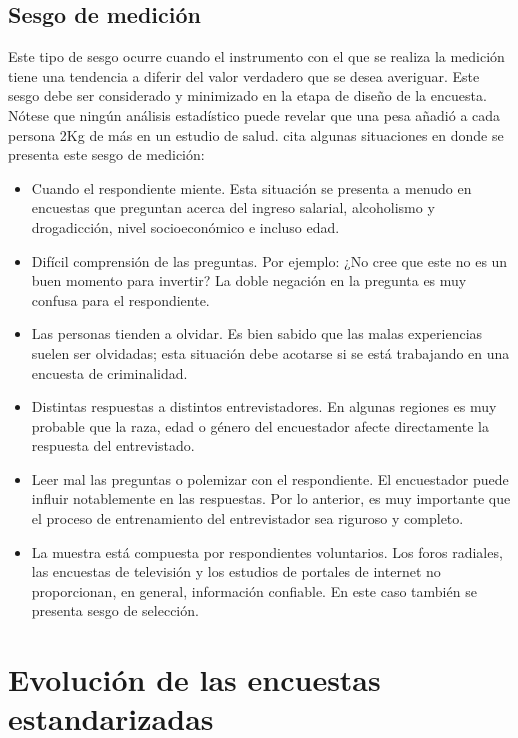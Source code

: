 \documentclass[
  12pt,
  spanish,
]{book}
\providecommand{\tightlist}{%
  \setlength{\itemsep}{0pt}\setlength{\parskip}{0pt}}
\begin{document}
\hypertarget{sesgo-de-mediciuxf3n}{%
\subsection*{Sesgo de medición}\label{sesgo-de-mediciuxf3n}}

Este tipo de sesgo ocurre cuando el instrumento con el que se realiza la medición tiene una tendencia a diferir del valor verdadero que se desea averiguar. Este sesgo debe ser considerado y minimizado en la etapa de diseño de la encuesta. Nótese que ningún análisis estadístico puede revelar que una pesa añadió a cada persona 2Kg de más en un estudio de salud. \citet{Loh} cita algunas situaciones en donde se presenta este sesgo de medición:

\begin{itemize}
\tightlist
\item
  Cuando el respondiente miente. Esta situación se presenta a menudo en encuestas que preguntan acerca del ingreso salarial, alcoholismo y drogadicción, nivel socioeconómico e incluso edad.
\item
  Difícil comprensión de las preguntas. Por ejemplo: ¿No cree que este no es un buen momento para invertir? La doble negación en la pregunta es muy confusa para el respondiente.
\item
  Las personas tienden a olvidar. Es bien sabido que las malas experiencias suelen ser olvidadas; esta situación debe acotarse si se está trabajando en una encuesta de criminalidad.
\item
  Distintas respuestas a distintos entrevistadores. En algunas regiones es muy probable que la raza, edad o género del encuestador afecte directamente la respuesta del entrevistado.
\item
  Leer mal las preguntas o polemizar con el respondiente. El encuestador puede influir notablemente en las respuestas. Por lo anterior, es muy importante que el proceso de entrenamiento del entrevistador sea riguroso y completo.
\item
  La muestra está compuesta por respondientes voluntarios. Los foros radiales, las encuestas de televisión y los estudios de portales de internet no proporcionan, en general, información confiable. En este caso también se presenta sesgo de selección.
\end{itemize}

\hypertarget{evoluciuxf3n-de-las-encuestas-estandarizadas}{%
\section{Evolución de las encuestas estandarizadas}\label{evoluciuxf3n-de-las-encuestas-estandarizadas}}
\end{document}
